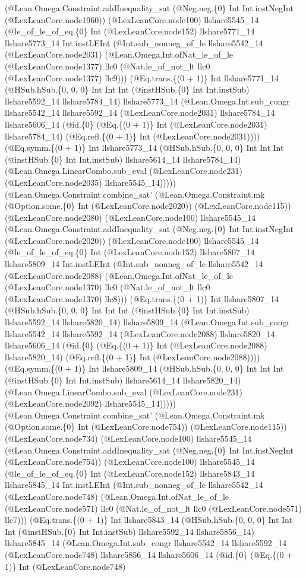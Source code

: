 \documentclass[11pt]{article}
\begin{document}
(@Lean.Omega.Constraint.addInequality\_sat (@Neg.neg.\{0\} Int Int.instNegInt (@LexLeanCore.node1960)) (@LexLeanCore.node100) llshare5545\_14 (@le\_of\_le\_of\_eq.\{0\} Int (@LexLeanCore.node152) llshare5771\_14 llshare5773\_14 Int.instLEInt (@Int.sub\_nonneg\_of\_le llshare5542\_14 (@LexLeanCore.node2031) (@Lean.Omega.Int.ofNat\_le\_of\_le (@LexLeanCore.node1377) llc0 (@Nat.le\_of\_not\_lt llc0 (@LexLeanCore.node1377) llc9))) (@Eq.trans.\{(0 + 1)\} Int llshare5771\_14 (@HSub.hSub.\{0, 0, 0\} Int Int Int (@instHSub.\{0\} Int Int.instSub) llshare5592\_14 llshare5784\_14) llshare5773\_14 (@Lean.Omega.Int.sub\_congr llshare5542\_14 llshare5592\_14 (@LexLeanCore.node2031) llshare5784\_14 llshare5606\_14 (@id.\{0\} (@Eq.\{(0 + 1)\} Int (@LexLeanCore.node2031) llshare5784\_14) (@Eq.refl.\{(0 + 1)\} Int (@LexLeanCore.node2031)))) (@Eq.symm.\{(0 + 1)\} Int llshare5773\_14 (@HSub.hSub.\{0, 0, 0\} Int Int Int (@instHSub.\{0\} Int Int.instSub) llshare5614\_14 llshare5784\_14) (@Lean.Omega.LinearCombo.sub\_eval (@LexLeanCore.node231) (@LexLeanCore.node2035) llshare5545\_14))))) (@Lean.Omega.Constraint.combine\_sat' (@Lean.Omega.Constraint.mk (@Option.some.\{0\} Int (@LexLeanCore.node2020)) (@LexLeanCore.node115)) (@LexLeanCore.node2080) (@LexLeanCore.node100) llshare5545\_14 (@Lean.Omega.Constraint.addInequality\_sat (@Neg.neg.\{0\} Int Int.instNegInt (@LexLeanCore.node2020)) (@LexLeanCore.node100) llshare5545\_14 (@le\_of\_le\_of\_eq.\{0\} Int (@LexLeanCore.node152) llshare5807\_14 llshare5809\_14 Int.instLEInt (@Int.sub\_nonneg\_of\_le llshare5542\_14 (@LexLeanCore.node2088) (@Lean.Omega.Int.ofNat\_le\_of\_le (@LexLeanCore.node1370) llc0 (@Nat.le\_of\_not\_lt llc0 (@LexLeanCore.node1370) llc8))) (@Eq.trans.\{(0 + 1)\} Int llshare5807\_14 (@HSub.hSub.\{0, 0, 0\} Int Int Int (@instHSub.\{0\} Int Int.instSub) llshare5592\_14 llshare5820\_14) llshare5809\_14 (@Lean.Omega.Int.sub\_congr llshare5542\_14 llshare5592\_14 (@LexLeanCore.node2088) llshare5820\_14 llshare5606\_14 (@id.\{0\} (@Eq.\{(0 + 1)\} Int (@LexLeanCore.node2088) llshare5820\_14) (@Eq.refl.\{(0 + 1)\} Int (@LexLeanCore.node2088)))) (@Eq.symm.\{(0 + 1)\} Int llshare5809\_14 (@HSub.hSub.\{0, 0, 0\} Int Int Int (@instHSub.\{0\} Int Int.instSub) llshare5614\_14 llshare5820\_14) (@Lean.Omega.LinearCombo.sub\_eval (@LexLeanCore.node231) (@LexLeanCore.node2092) llshare5545\_14))))) (@Lean.Omega.Constraint.combine\_sat' (@Lean.Omega.Constraint.mk (@Option.some.\{0\} Int (@LexLeanCore.node754)) (@LexLeanCore.node115)) (@LexLeanCore.node734) (@LexLeanCore.node100) llshare5545\_14 (@Lean.Omega.Constraint.addInequality\_sat (@Neg.neg.\{0\} Int Int.instNegInt (@LexLeanCore.node754)) (@LexLeanCore.node100) llshare5545\_14 (@le\_of\_le\_of\_eq.\{0\} Int (@LexLeanCore.node152) llshare5843\_14 llshare5845\_14 Int.instLEInt (@Int.sub\_nonneg\_of\_le llshare5542\_14 (@LexLeanCore.node748) (@Lean.Omega.Int.ofNat\_le\_of\_le (@LexLeanCore.node571) llc0 (@Nat.le\_of\_not\_lt llc0 (@LexLeanCore.node571) llc7))) (@Eq.trans.\{(0 + 1)\} Int llshare5843\_14 (@HSub.hSub.\{0, 0, 0\} Int Int Int (@instHSub.\{0\} Int Int.instSub) llshare5592\_14 llshare5856\_14) llshare5845\_14 (@Lean.Omega.Int.sub\_congr llshare5542\_14 llshare5592\_14 (@LexLeanCore.node748) llshare5856\_14 llshare5606\_14 (@id.\{0\} (@Eq.\{(0 + 1)\} Int (@LexLeanCore.node748) 
\end{document}
